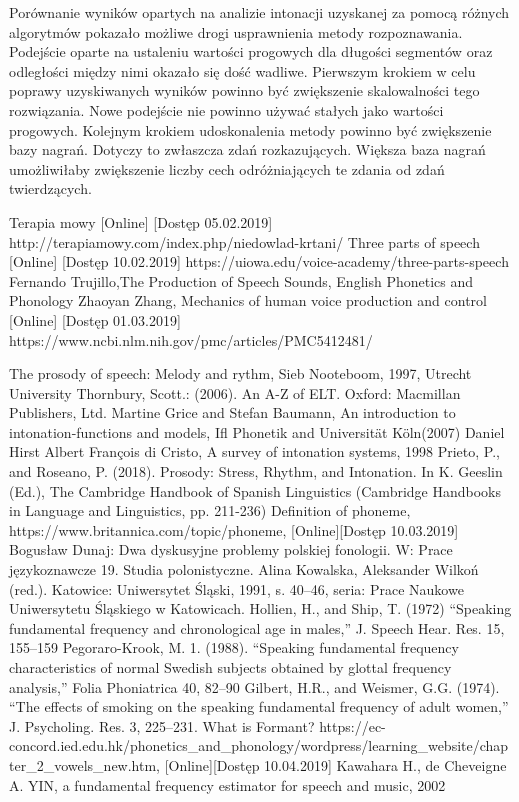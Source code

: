 \documentclass[a4paper,12 pt]{report}
\begin{document}
Porównanie wyników opartych na analizie intonacji uzyskanej za pomocą różnych algorytmów pokazało możliwe drogi usprawnienia metody rozpoznawania. Podejście oparte na ustaleniu wartości progowych dla długości segmentów oraz odległości między nimi okazało się dość wadliwe. Pierwszym krokiem w celu poprawy uzyskiwanych wyników powinno być zwiększenie skalowalności tego rozwiązania. Nowe podejście nie powinno używać stałych jako wartości progowych.
Kolejnym krokiem udoskonalenia metody powinno być zwiększenie bazy nagrań. Dotyczy to zwłaszcza zdań rozkazujących. Większa baza nagrań umożliwiłaby zwiększenie liczby cech odróżniających te zdania od zdań twierdzących.
\newpage

\begin{thebibliography}{99}
Terapia mowy [Online] [Dostęp 05.02.2019]
http://terapiamowy.com/index.php/niedowlad-krtani/
Three parts of speech [Online] [Dostęp 10.02.2019]
https://uiowa.edu/voice-academy/three-parts-speech
 Fernando Trujillo,The Production of Speech Sounds, English Phonetics and Phonology
Zhaoyan Zhang, Mechanics of human voice production and control [Online] [Dostęp 01.03.2019]
https://www.ncbi.nlm.nih.gov/pmc/articles/PMC5412481/

The prosody of speech: Melody and rythm, Sieb Nooteboom, 1997, Utrecht University
Thornbury, Scott.:
 (2006). An A-Z of ELT. Oxford: Macmillan Publishers, Ltd.
Martine Grice and Stefan Baumann, An introduction to intonation-functions and models, Ifl Phonetik and Universität Köln(2007)
Daniel Hirst Albert François di Cristo, A survey of intonation systems, 1998
Prieto, P., and Roseano, P. (2018). Prosody: Stress, Rhythm, and Intonation. In K. Geeslin (Ed.), The Cambridge Handbook of Spanish Linguistics (Cambridge Handbooks in Language and Linguistics, pp. 211-236)
Definition of phoneme, https://www.britannica.com/topic/phoneme, [Online][Dostęp 10.03.2019]
Bogusław Dunaj: Dwa dyskusyjne problemy polskiej fonologii. W: Prace językoznawcze 19. Studia polonistyczne. Alina Kowalska, Aleksander Wilkoń (red.). Katowice: Uniwersytet Śląski, 1991, s. 40–46, seria: Prace Naukowe Uniwersytetu Śląskiego w Katowicach.
Hollien, H., and Ship, T. (1972) “Speaking fundamental frequency and chronological age in males,” J. Speech Hear. Res. 15, 155–159
Pegoraro-Krook, M. 1. (1988). “Speaking fundamental frequency characteristics of normal Swedish subjects obtained by glottal frequency analysis,” Folia Phoniatrica 40, 82–90
Gilbert, H.R., and Weismer, G.G. (1974). “The effects of smoking on the speaking fundamental frequency of adult women,” J. Psycholing. Res. 3, 225–231. 
What is Formant? https://ec-concord.ied.edu.hk/phonetics\_and\_phonology/wordpress/learning\_website/chapter\_2\_vowels\_new.htm, [Online][Dostęp 10.04.2019]
Kawahara H., de Cheveigne A. YIN, a fundamental frequency estimator for speech and music, 2002

\end{thebibliography}
\end{document}
